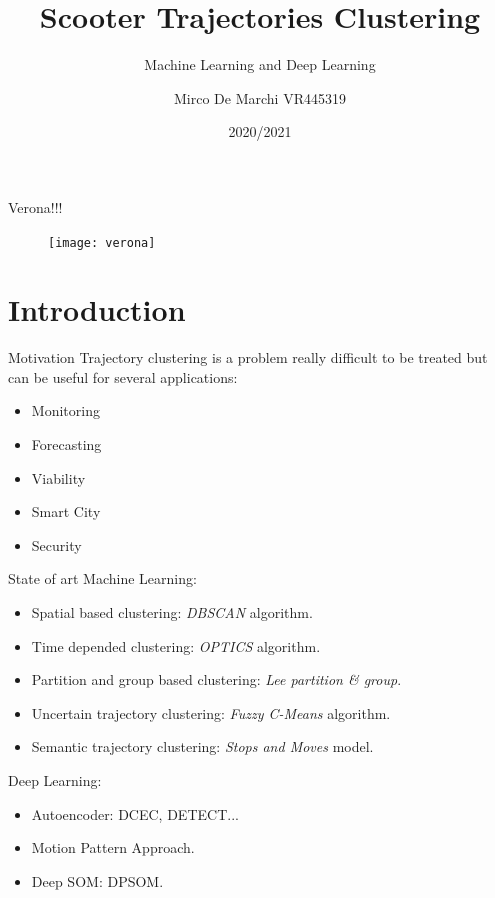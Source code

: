 \documentclass{beamer}
\title{Scooter Trajectories Clustering}
\subtitle{Machine Learning and Deep Learning}
\author{Mirco De Marchi VR445319}
\institute{University of Verona}
\date{2020/2021}
\begin{document}
\begin{frame}
\maketitle
\end{frame}

\begin{frame}{Verona!!!}
	\begin{figure}[bt]
		\centering
		\texttt{[image: verona]}
		\label{fig:verona}
	\end{figure}
\end{frame}


\section{Introduction}

\begin{frame}{Motivation}
 Trajectory clustering is a problem really difficult to be treated but can be useful for several applications:
 \begin{itemize}
 	\item Monitoring
 	\item Forecasting
 	\item Viability
 	\item Smart City
 	\item Security
 \end{itemize}
\end{frame}

\begin{frame}{State of art}
Machine Learning:
\begin{itemize}
	\item Spatial based clustering: \textit{DBSCAN} algorithm.
	\item Time depended clustering: \textit{OPTICS} algorithm.
	\item Partition and group based clustering: \textit{Lee partition \& group}.
	\item Uncertain trajectory clustering: \textit{Fuzzy C-Means} algorithm.
	\item Semantic trajectory clustering: \textit{Stops and Moves} model.
\end{itemize}

Deep Learning: 
\begin{itemize}
	\item Autoencoder: DCEC, DETECT...
	\item Motion Pattern Approach.
	\item Deep SOM: DPSOM.
\end{itemize}
\end{frame}
\end{document}
